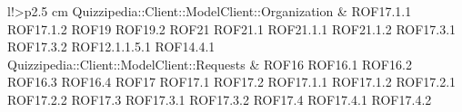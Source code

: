 \begin{tabella}{l!{\VRule}>{\centering\arraybackslash}p{2.5 cm}}
Quizzipedia::Client::ModelClient::Organization & ROF17.1.1 \linebreak ROF17.1.2 \linebreak ROF19 \linebreak ROF19.2 \linebreak ROF21 \linebreak ROF21.1 \linebreak ROF21.1.1 \linebreak ROF21.1.2 \linebreak ROF17.3.1 \linebreak ROF17.3.2 \linebreak ROF12.1.1.5.1 \linebreak ROF14.4.1 \\
Quizzipedia::Client::ModelClient::Requests & ROF16 \linebreak ROF16.1 \linebreak ROF16.2 \linebreak ROF16.3 \linebreak ROF16.4 \linebreak ROF17 \linebreak ROF17.1 \linebreak ROF17.2 \linebreak ROF17.1.1 \linebreak ROF17.1.2 \linebreak ROF17.2.1 \linebreak ROF17.2.2 \linebreak ROF17.3 \linebreak ROF17.3.1 \linebreak ROF17.3.2 \linebreak ROF17.4 \linebreak ROF17.4.1 \linebreak ROF17.4.2 \\

\end{tabella}
